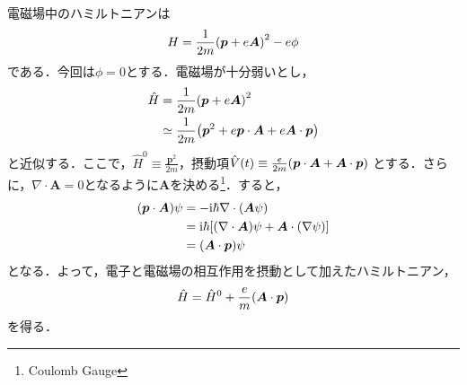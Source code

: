 \documentclass{report}
\begin{document}
  電磁場中のハミルトニアンは
  \begin{equation}
    H=\frac{1}{2m}\qty(\bm{p} + e\bm{A})^2 - e\phi
  \end{equation}
  である．今回は$\phi=0$とする．電磁場が十分弱いとし，
  \begin{align}
    \hat{H} &= \frac{1}{2m}\qty(\bm{p}+e\bm{A})^2\\
    &\simeq \frac{1}{2m}\qty(\bm{p}^2+e\bm{p}\cdot\bm{A} + e\bm{A} \cdot \bm{p})\\
  \end{align}
  と近似する．ここで，$\hat{H}^0 \equiv \frac{\bm{p}^2}{2m}$，摂動項$\hat{V}(t) \equiv \frac{e}{2m} \qty(\bm{p}\cdot\bm{A} + \bm{A} \cdot \bm{p})$
  とする．さらに，$\nabla\cdot\bm{A}=0$となるように$\bm{A}$を決める\footnote{Coulomb Gauge}．すると，
  \begin{align}
    \qty(\bm{p} \cdot \bm{A})\psi &= -\mathrm{i}\hbar \nabla \cdot \qty(\bm{A} \psi)\\
    &= \mathrm{i}\hbar\qty[\qty(\nabla \cdot \bm{A}) \psi + \bm{A} \cdot \qty(\nabla \psi)]\\
    &= \qty(\bm{A} \cdot \bm{p}) \psi
  \end{align}
  となる．よって，電子と電磁場の相互作用を摂動として加えたハミルトニアン，
  \begin{equation}
    \hat{H} = \hat{H}^0 + \frac{e}{m}\qty(\bm{A} \cdot \bm{p})
  \end{equation}
  を得る．
\end{document}
